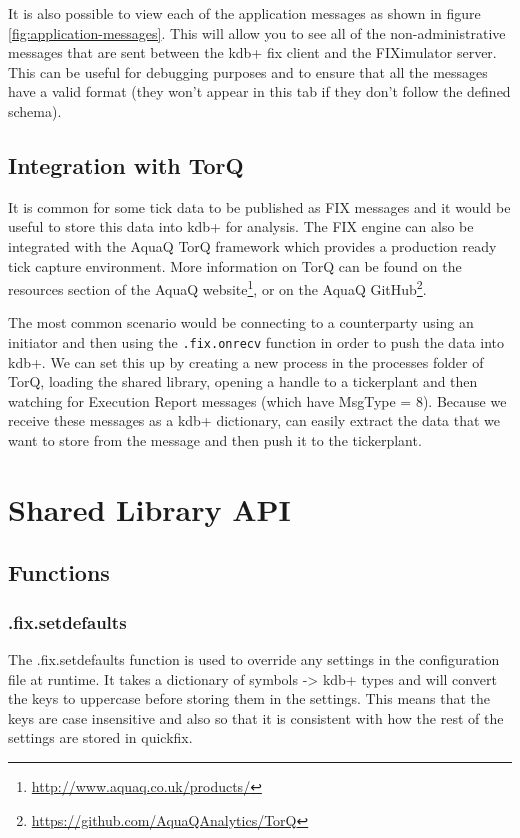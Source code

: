 It is also possible to view each of the application messages as shown in figure \ref{fig:application-messages}. This will allow you to see all of the non-administrative messages
that are sent between the kdb+ fix client and the FIXimulator server. This can be useful for debugging
purposes and to ensure that all the messages have a valid format (they won't appear in this tab if they
don't follow the defined schema).

\section{Integration with TorQ}

It is common for some tick data to be published as FIX messages and it would be useful to store this
data into kdb+ for analysis. The FIX engine can also be integrated with the AquaQ TorQ framework which provides a production ready tick capture environment. More information on TorQ can be found on the resources section of the AquaQ website\footnote{\url{http://www.aquaq.co.uk/products/}},
 or on the AquaQ GitHub\footnote{\url{https://github.com/AquaQAnalytics/TorQ}}.
 
The most common scenario would be connecting to a counterparty using an initiator and then using the
\texttt{.fix.onrecv} function in order to push the data into kdb+. We can set this up by creating a new process in the processes folder of TorQ, loading the shared library, opening a handle to a tickerplant and then watching for Execution Report messages (which have MsgType = 8). Because we
receive these messages as a kdb+ dictionary, can easily extract the data that we want to store from
the message and then push it to the tickerplant.

\chapter{Shared Library API}
\section{Functions}

\subsection{.fix.setdefaults}
\label{func:setdefaults}

The .fix.setdefaults function is used to override any settings in the configuration file at runtime. It takes a dictionary of symbols -> kdb+ types and will convert the keys to uppercase before storing them in the settings. This means that the keys are case insensitive and also so that it is consistent with how the rest of the settings are stored in quickfix.

